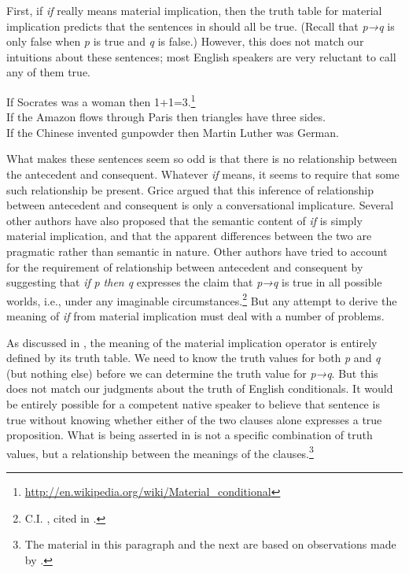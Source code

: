 First, if \textit{if} really means material implication, then the truth table for material implication predicts that the sentences in  should all be true. (Recall that \textit{p→q} is only false when \textit{p} is true and \textit{q} is false.) However, this does not match our intuitions about these sentences; most English speakers are very reluctant to call any of them true.


\ea
\ea If Socrates was a woman then 1+1=3.\footnote{\url{http://en.wikipedia.org/wiki/Material_conditional}} \\
\ex If the Amazon flows through Paris then triangles have three sides.\\
\ex If the Chinese invented gunpowder then Martin Luther was German.
                       \z
\z


What makes these sentences seem so odd is that there is no relationship between the antecedent and consequent. Whatever \textit{if} means, it seems to require that some such relationship be present. Grice argued that this inference of relationship between antecedent and consequent is only a conversational implicature. Several other authors have also proposed that the semantic content of \textit{if} is simply material implication, and that the apparent differences between the two are pragmatic rather than semantic in nature. Other authors have tried to account for the requirement of relationship between antecedent and consequent by suggesting that \textit{if} \textit{p then q} expresses the claim that \textit{p→q} is true in all possible worlds, i.e., under any imaginable circumstances.\footnote{C.I. \citet{Lewis1918}, cited in \citet{vonFintel2011}.} But any attempt to derive the meaning of \textit{if} from material implication must deal with a number of problems.



As discussed in , the meaning of the material implication operator is entirely defined by its truth table. We need to know the truth values for both \textit{p} and \textit{q} (but nothing else) before we can determine the truth value for \textit{p→q}. But this does not match our judgments about the truth of English conditionals. It would be entirely possible for a competent native speaker to believe that sentence  is true without knowing whether either of the two clauses alone expresses a true proposition. What is being asserted in  is not a specific combination of truth values, but a relationship between the meanings of the clauses.\footnote{The material in this paragraph and the next are based on observations made by \citet{Podlesskaya2001}.}


